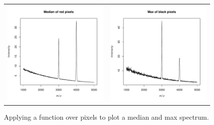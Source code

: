 \documentclass[a4paper]{article}
\begin{document}
\begin{figure}
\begin{center}
\begin{tabular}{cc}
\includegraphics{Cardinal-demo-023}
&
\includegraphics{Cardinal-demo-024}
\end{tabular}
\caption{\small Applying a function over pixels to plot a median and max spectrum.}
\end{center}
\end{figure}
\end{document}

